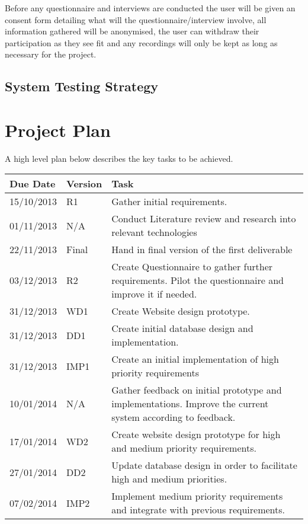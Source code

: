 \documentclass[a4paper,oneside,11pt]{report}
\begin{document}
Before any questionnaire and interviews are conducted the user will be given an consent form detailing what will the questionnaire/interview involve, all information gathered will be anonymised, the user can withdraw their participation as they see fit and any recordings will only be kept as long as necessary for the project.
\section{System Testing Strategy}


\chapter{Project Plan}
A high level plan below describes the key tasks to be achieved.
\begin{center}
	\begin{table}[!ht]
    \begin{tabular}[ht]{| l | l | p{11cm} |}
    \hline
    Due Date & Version & Task \\ 
    \hline
    15/10/2013 & R1 & Gather initial requirements.\\ 
    \hline
    01/11/2013 & N/A & Conduct Literature review and research into relevant 												  technologies \\ 
    \hline
    22/11/2013 & Final & Hand in final version of the first deliverable \\ 
    \hline
    03/12/2013 & R2 & Create Questionnaire to gather further requirements. Pilot the 										questionnaire and improve it if needed.\\ 
    \hline
    31/12/2013 & WD1 & Create Website design prototype.\\
    \hline
    31/12/2013 & DD1 & Create initial database design and implementation.\\
    \hline
    31/12/2013 & IMP1 & Create an initial implementation of high priority requirements\\
    \hline
    10/01/2014 & N/A & Gather feedback on initial prototype and implementations. Improve 	                  				   the current system according to feedback.\\
    \hline
     17/01/2014 & WD2 & Create website design prototype for high and medium priority 										  requirements.\\
    \hline
    27/01/2014 & DD2 & Update database design in order to facilitate high and medium 		 								 priorities.\\
    \hline
    07/02/2014 & IMP2 & Implement medium priority requirements and integrate with previous requirements.		\\

\end{tabular}
\end{table}
\end{center}
\end{document}
